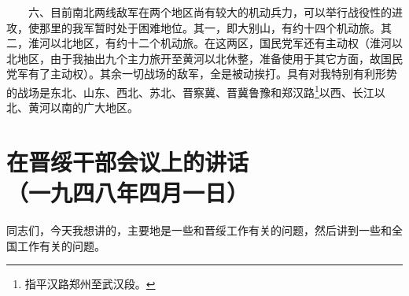 \documentclass[cn,11pt,chinese]{elegantbook}
\def\myformat#1{\hfil\hfil #1}
\begin{document}
　　六、目前南北两线敌军在两个地区尚有较大的机动兵力，可以举行战役性的进攻，使那里的我军暂时处于困难地位。其一，即大别山，有约十四个机动旅。其二，淮河以北地区，有约十二个机动旅。在这两区，国民党军还有主动权（淮河以北地区，由于我抽出九个主力旅开至黄河以北休整，准备使用于其它方面，故国民党军有了主动权）。其余一切战场的敌军，全是被动挨打。具有对我特别有利形势的战场是东北、山东、西北、苏北、晋察冀、晋冀鲁豫和郑汉路\footnote[8]{ 指平汉路郑州至武汉段。}以西、长江以北、黄河以南的广大地区。\\
\newpage\section*{\myformat{在晋绥干部会议上的讲话}\\\myformat{（一九四八年四月一日）}}
同志们，今天我想讲的，主要地是一些和晋绥工作有关的问题，然后讲到一些和全国工作有关的问题。\\
\end{document}

